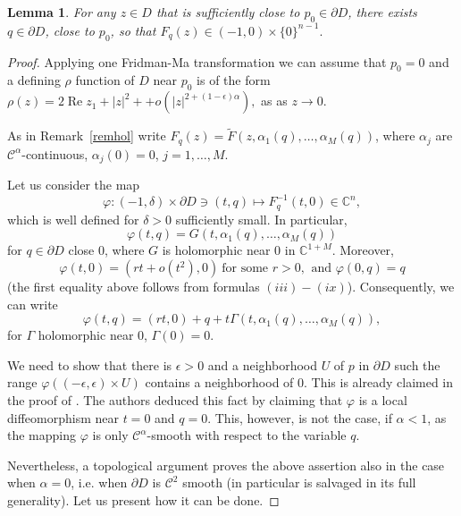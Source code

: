 \documentclass[a4paper,12pt]{amsart}
\def\re{\operatorname{Re}}
\newtheorem{lemma}[theorem]{Lemma}
\theoremstyle{remark}\newtheorem{remark}[theorem]{Remark}
\begin{document}
\begin{lemma}
\label{rem} For any $z\in D$ that is sufficiently close to $p_0\in \partial D$,
there exists $q\in \partial D$, close to $p_0$, so that $F_q(z)\in (-1,0)\times \{0\}^{n-1}.$ 
\end{lemma}
\begin{proof}
Applying one Fridman-Ma transformation we can assume that $p_0=0$ and a defining $\rho$ function of $D$ near $p_0$ is of the form $\rho(z) = 2 \re z_1 +|z|^2 + + o(|z|^{2+(1-\epsilon)\alpha}),$ as as $z\to 0$.

As in Remark~\ref{remhol} write $F_q(z)=\tilde F(z, \alpha_1(q), \ldots, \alpha_M(q))$, where $\alpha_j$ are $\mathcal C^\alpha$-continuous, $\alpha_j(0)=0$, $j=1,\ldots, M$. 

Let us consider the map
$$\varphi:(-1,\delta)\times \partial D\ni (t,q)\mapsto F_q^{-1}(t,0)\in \mathbb C^n,$$ which is well defined for $\delta>0$ sufficiently small.  In particular,
\begin{equation*}\varphi(t,q) = G(t, \alpha_1(q), \ldots, \alpha_M(q))
\end{equation*}
for $q\in \partial D$ close $0$, where $G$ is holomorphic near $0$ in $\mathbb C^{1+M}$. Moreover,
\begin{equation*}\label{Fq1} \varphi(t,0)=(r t+o(t^2),0) \ \text{for some $r>0$, } \ \text{and } \varphi(0,q)=q
\end{equation*}
(the first equality above follows from formulas $(iii)-(ix)$).
Consequently, we can write 
\begin{equation}\label{Fq}\varphi(t,q) = (rt,0) + q + t \Gamma(t,\alpha_1(q),\ldots, \alpha_M(q)),
\end{equation} for $\Gamma$ holomorphic near $0$, $\Gamma(0)=0$.

We need to show that there is $\epsilon>0$ and a neighborhood $U$ of $p$ in $\partial D$ such the range $\varphi((-\epsilon, \epsilon)\times U)$ contains a neighborhood of $0$. This is already claimed in the proof of \cite[Theorem 4.1]{DGZ}. The authors deduced this fact by claiming that $\varphi$ is a local diffeomorphism near $t=0$ and $q=0$. This, however, is not the case, if $\alpha<1$, as the mapping $\varphi$ is only $\mathcal C^\alpha$-smooth with respect to the variable $q$.

Nevertheless, a topological argument proves the above assertion also in the case when $\alpha=0$, i.e. when $\partial D$ is $\mathcal C^2$ smooth (in particular \cite[Theorem 4.1]{DGZ} is salvaged in its full generality). Let us present how it can be done.


\end{proof}
\end{document}
